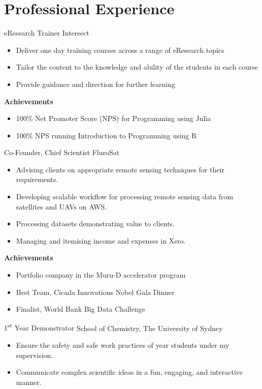 \pagebreak
\section{Professional Experience}

{eResearch Trainer}
{Intersect}{}{}
{%
  \begin{itemize}
    \item Deliver one day training courses across a range of eResearch topics
    \item Tailor the content to the knowledge and ability of the students in each course
    \item Provide guidance and direction for further learning
  \end{itemize}
  \textbf{Achievements}
  \begin{itemize}
    \item 100\% Net Promoter Score (NPS) for Programming using Julia
    \item 100\% NPS running Introduction to Programming using R
  \end{itemize}
}
\vspace{1em}

{Co-Founder, Chief Scientist}
{FluroSat}{}{}
{%
  \begin{itemize}
    \item Advising clients on appropriate remote sensing techniques for their
      requirements.
    \item Developing scalable workflow for processing remote sensing data
      from satellites and UAVs on AWS.
    \item Processing datasets demonstrating value to clients.
    \item Managing and itemising income and expenses in Xero.
  \end{itemize}
  \textbf{Achievements}
  \begin{itemize}
    \item Portfolio company in the Muru-D accelerator program
    \item Best Team, Cicada Innovations Nobel Gala Dinner
    \item Finalist, World Bank Big Data Challenge
  \end{itemize}
}
\vspace{1em}

{1\textsuperscript{st} Year Demonstrator}
{School of Chemistry, The University of Sydney}
{}{}
{%
    \begin{itemize}
      \item Ensure the safety and safe work practices
        of  year students under my supervision.
      \item Communicate complex scientific ideas
        in a fun, engaging, and interactive manner.
    \end{itemize}
}
\vspace{1em}

